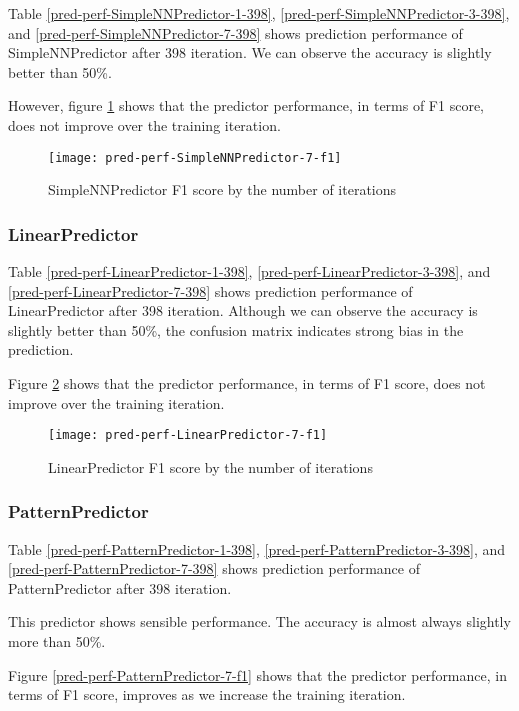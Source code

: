 \documentclass[twocolumn,10pt]{asme2ej}
\begin{document}
Table \ref{pred-perf-SimpleNNPredictor-1-398}, \ref{pred-perf-SimpleNNPredictor-3-398}, and
\ref{pred-perf-SimpleNNPredictor-7-398} shows prediction performance of
SimpleNNPredictor after 398 iteration. We can observe the accuracy is slightly better than 50\%.

However, figure \ref{pred-perf-SimpleNNPredictor-7-f1} shows that the predictor
performance, in terms of F1 score, does not improve over the training
iteration. 

\begin{figure}
  \centering
  \texttt{[image: pred-perf-SimpleNNPredictor-7-f1]}
  \caption{SimpleNNPredictor F1 score by the number of iterations}
  \label{pred-perf-SimpleNNPredictor-7-f1}
\end{figure}

\subsubsection{LinearPredictor}

Table \ref{pred-perf-LinearPredictor-1-398},
\ref{pred-perf-LinearPredictor-3-398}, and
\ref{pred-perf-LinearPredictor-7-398} shows prediction performance of
LinearPredictor after 398 iteration. Although we can observe the
accuracy is slightly better than 50\%, the confusion matrix indicates
strong bias in the prediction.

Figure \ref{pred-perf-LinearPredictor-7-f1} shows that the predictor
performance, in terms of F1 score, does not improve over the training
iteration. 

\begin{figure}
  \centering
  \texttt{[image: pred-perf-LinearPredictor-7-f1]}
  \caption{LinearPredictor F1 score by the number of iterations}
  \label{pred-perf-LinearPredictor-7-f1}
\end{figure}

\subsubsection{PatternPredictor}

Table \ref{pred-perf-PatternPredictor-1-398},
\ref{pred-perf-PatternPredictor-3-398}, and
\ref{pred-perf-PatternPredictor-7-398} shows prediction performance of
PatternPredictor after 398 iteration.

This predictor shows sensible performance. The accuracy is almost
always slightly more than 50\%. 

Figure \ref{pred-perf-PatternPredictor-7-f1} shows that the predictor
performance, in terms of F1 score, improves as we increase the
training iteration.
\end{document}

